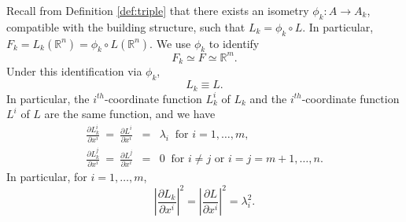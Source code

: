 \documentclass[12pt]{amsart}
\theoremstyle{definition}
\numberwithin{equation}{section}
\newcommand{\R}{\mathbb R}
\begin{document}
Recall from Definition \ref{def:triple} that there exists an isometry $\phi_k:A \to A_k$, compatible with the building structure, such that $L_k = \phi_k \circ L$. 
In particular, 
$
F_k =L_k(\R^n) =\phi_k \circ L(\R^n).
$
We use $\phi_k$ to identify 
\begin{equation} \label{simeq}
F_k  \simeq  F \simeq \R^m.
\end{equation} 
Under this identification  via $\phi_k$,  
\begin{equation}\label{star}
L_k \equiv L.
\end{equation} 
In particular, the $i^{th}$-coordinate function $L^i_k$ of $L_k$ and the $i^{th}$-coordinate function $L^i$ of $L$ are the same function, and we have 
\begin{eqnarray*}
 \frac{\partial L^i_k}{\partial x^i}  \ = \  \frac{\partial L^i}{\partial x^i} & = &  \lambda_i \ \mbox{ for } i=1, \dots, m,  
\\ 
 \frac{\partial L^j_k}{\partial x^i}  \ = \  \frac{\partial L^j}{\partial x^i} & = &  0 \ \mbox{ for }i \neq j \mbox{ or } i=j=m+1, \dots, n. \nonumber
\end{eqnarray*}
In particular,  for $i=1, \dots, m$, 
\begin{equation}  \label{lambdai}
\left|  \frac{\partial L_k}{\partial x^i} \right|^2 = \left|  \frac{\partial L}{\partial x^i} \right|^2= \lambda_i^2.
\end{equation}
\end{document}
